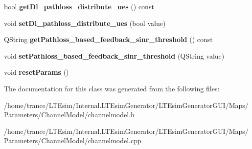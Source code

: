 \begin{DoxyCompactItemize}
\item 
bool {\bfseries get\+Dl\+\_\+pathloss\+\_\+distribute\+\_\+ues} () const \hypertarget{class_channel_model_ab5abe9f64753c2337c50ed2e41df2590}{}\label{class_channel_model_ab5abe9f64753c2337c50ed2e41df2590}

\item 
void {\bfseries set\+Dl\+\_\+pathloss\+\_\+distribute\+\_\+ues} (bool value)\hypertarget{class_channel_model_a02523ac96840775d480f2ef7a81922c3}{}\label{class_channel_model_a02523ac96840775d480f2ef7a81922c3}

\item 
Q\+String {\bfseries get\+Pathloss\+\_\+based\+\_\+feedback\+\_\+sinr\+\_\+threshold} () const \hypertarget{class_channel_model_a88f6550fe468fdedca79d495b433b863}{}\label{class_channel_model_a88f6550fe468fdedca79d495b433b863}

\item 
void {\bfseries set\+Pathloss\+\_\+based\+\_\+feedback\+\_\+sinr\+\_\+threshold} (Q\+String value)\hypertarget{class_channel_model_ac779db5ceaa77d25326950c509f2e4c7}{}\label{class_channel_model_ac779db5ceaa77d25326950c509f2e4c7}

\item 
void {\bfseries reset\+Params} ()\hypertarget{class_channel_model_a483456aa92195b123cb747b31c525db9}{}\label{class_channel_model_a483456aa92195b123cb747b31c525db9}

\end{DoxyCompactItemize}


The documentation for this class was generated from the following files\+:\begin{DoxyCompactItemize}
\item 
/home/trance/\+L\+T\+Esim/\+Internal.\+L\+T\+Esim\+Generator/\+L\+T\+Esim\+Generator\+G\+U\+I/\+Maps/\+Parameters/\+Channel\+Model/channelmodel.\+h\item 
/home/trance/\+L\+T\+Esim/\+Internal.\+L\+T\+Esim\+Generator/\+L\+T\+Esim\+Generator\+G\+U\+I/\+Maps/\+Parameters/\+Channel\+Model/channelmodel.\+cpp\end{DoxyCompactItemize}
